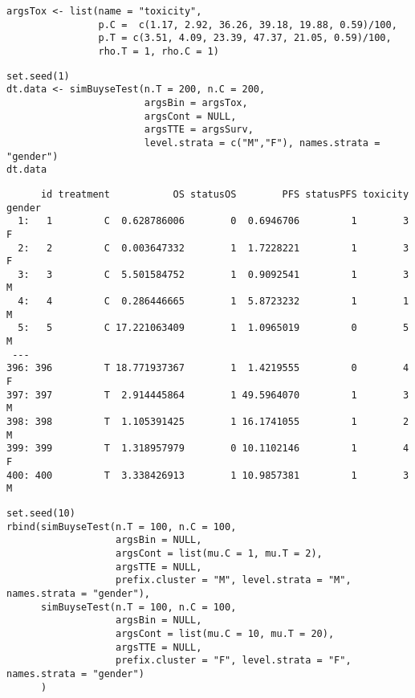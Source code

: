 \documentclass[12pt]{article}
\begin{document}
\lstset{language=r,label= ,caption= ,captionpos=b,numbers=none}
\begin{lstlisting}
argsTox <- list(name = "toxicity",
                p.C =  c(1.17, 2.92, 36.26, 39.18, 19.88, 0.59)/100,
                p.T = c(3.51, 4.09, 23.39, 47.37, 21.05, 0.59)/100,
                rho.T = 1, rho.C = 1)
\end{lstlisting}

\lstset{language=r,label= ,caption= ,captionpos=b,numbers=none}
\begin{lstlisting}
set.seed(1)
dt.data <- simBuyseTest(n.T = 200, n.C = 200,
                        argsBin = argsTox,
                        argsCont = NULL,
                        argsTTE = argsSurv,
                        level.strata = c("M","F"), names.strata = "gender")
dt.data
\end{lstlisting}

\begin{verbatim}
      id treatment           OS statusOS        PFS statusPFS toxicity gender
  1:   1         C  0.628786006        0  0.6946706         1        3      F
  2:   2         C  0.003647332        1  1.7228221         1        3      F
  3:   3         C  5.501584752        1  0.9092541         1        3      M
  4:   4         C  0.286446665        1  5.8723232         1        1      M
  5:   5         C 17.221063409        1  1.0965019         0        5      M
 ---                                                                         
396: 396         T 18.771937367        1  1.4219555         0        4      F
397: 397         T  2.914445864        1 49.5964070         1        3      M
398: 398         T  1.105391425        1 16.1741055         1        2      M
399: 399         T  1.318957979        0 10.1102146         1        4      F
400: 400         T  3.338426913        1 10.9857381         1        3      M
\end{verbatim}


\lstset{language=r,label= ,caption= ,captionpos=b,numbers=none}
\begin{lstlisting}
set.seed(10)
rbind(simBuyseTest(n.T = 100, n.C = 100,
                   argsBin = NULL,
                   argsCont = list(mu.C = 1, mu.T = 2),
                   argsTTE = NULL,
                   prefix.cluster = "M", level.strata = "M", names.strata = "gender"),
      simBuyseTest(n.T = 100, n.C = 100,
                   argsBin = NULL,
                   argsCont = list(mu.C = 10, mu.T = 20),
                   argsTTE = NULL,
                   prefix.cluster = "F", level.strata = "F", names.strata = "gender")
      )
\end{lstlisting}
\end{document}
